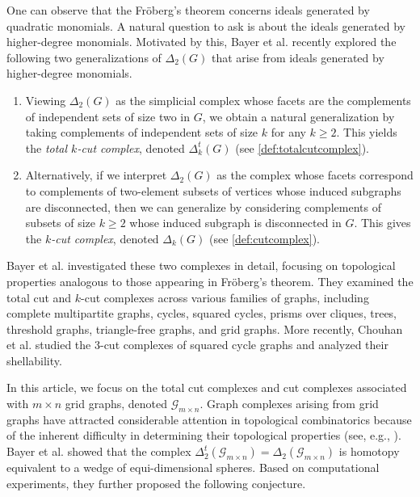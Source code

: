 \documentclass[11pt,reqno,a4paper]{amsart}
\theoremstyle{definition}
\theoremstyle{theorem}
\newcommand{\mgg}{\mathcal{G}_{m\times n}}
\theoremstyle{remark}
\begin{document}
One can observe that the Fr{\"o}berg's theorem concerns ideals generated by quadratic monomials. A natural question to ask is about the ideals generated by higher-degree monomials. Motivated by this, Bayer et al. recently explored the following two generalizations of $\Delta_2(G)$ that arise from ideals generated by higher-degree monomials.

\begin{enumerate}
    \item Viewing $\Delta_2(G)$ as the simplicial complex whose facets are the complements of independent sets of size two in $G$, we obtain a natural generalization by taking complements of independent sets of size $k$ for any $k \ge 2$. This yields the \emph{total $k$-cut complex}, denoted $\Delta_k^t(G)$ (see \cref{def:totalcutcomplex}).

    \item Alternatively, if we interpret $\Delta_2(G)$ as the complex whose facets correspond to complements of two-element subsets of vertices whose induced subgraphs are disconnected, then we can generalize by considering complements of subsets of size $k \ge 2$ whose induced subgraph is disconnected in $G$. This gives the \emph{$k$-cut complex}, denoted $\Delta_k(G)$ (see \cref{def:cutcomplex}).
\end{enumerate}

Bayer et al. \cite{bayer2024cut, bayer2024total, bayer2024cutB} investigated these two complexes in detail, focusing on topological properties analogous to those appearing in Fr{\"o}berg’s theorem. They examined the total cut and 
$k$-cut complexes across various families of graphs, including complete multipartite graphs, cycles, squared cycles, prisms over cliques, trees, threshold graphs, triangle-free graphs, and grid graphs. More recently, Chouhan et al. \cite{Chauhan2025} studied the 3-cut complexes of squared cycle graphs and analyzed their shellability.

In this article, we focus on the total cut complexes and cut complexes associated with $m \times n$ grid graphs, denoted $\mgg$. Graph complexes arising from grid graphs have attracted considerable attention in topological combinatorics because of the inherent difficulty in determining their topological properties (see, e.g., \cite{BH17, chandrakar2024perfect,Matsushitamatching,Matsushitantimes4}). Bayer et al. showed that the complex $\Delta_2^t(\mgg) = \Delta_2(\mgg)$ is homotopy equivalent to a wedge of equi-dimensional spheres. Based on computational experiments, they further proposed the following conjecture.
\end{document}
